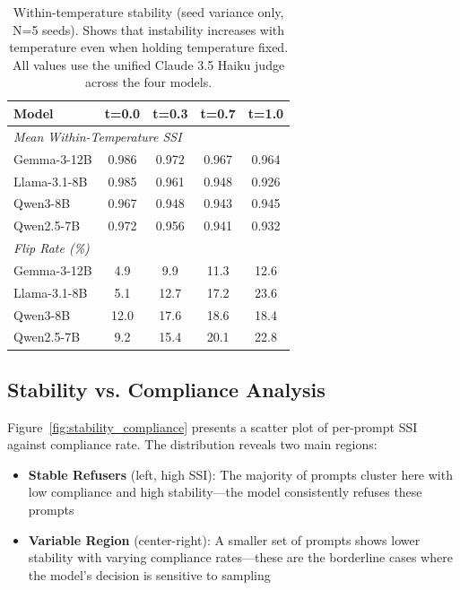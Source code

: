 \documentclass[11pt]{article}
\begin{document}
\begin{table}[h]
\centering
\caption{Within-temperature stability (seed variance only, N=5 seeds). Shows that instability increases with temperature even when holding temperature fixed. All values use the unified Claude 3.5 Haiku judge across the four models.}
\label{tab:within_temp}
\begin{tabular}{lcccc}
\toprule
\textbf{Model} & \textbf{t=0.0} & \textbf{t=0.3} & \textbf{t=0.7} & \textbf{t=1.0} \\
\midrule
\multicolumn{5}{l}{\textit{Mean Within-Temperature SSI}} \\
Gemma-3-12B & 0.986 & 0.972 & 0.967 & 0.964 \\
Llama-3.1-8B & 0.985 & 0.961 & 0.948 & 0.926 \\
Qwen3-8B & 0.967 & 0.948 & 0.943 & 0.945 \\
Qwen2.5-7B & 0.972 & 0.956 & 0.941 & 0.932 \\
\midrule
\multicolumn{5}{l}{\textit{Flip Rate (\%)}} \\
Gemma-3-12B & 4.9 & 9.9 & 11.3 & 12.6 \\
Llama-3.1-8B & 5.1 & 12.7 & 17.2 & 23.6 \\
Qwen3-8B & 12.0 & 17.6 & 18.6 & 18.4 \\
Qwen2.5-7B & 9.2 & 15.4 & 20.1 & 22.8 \\
\bottomrule
\end{tabular}
\end{table}

\subsection{Stability vs. Compliance Analysis}

Figure~\ref{fig:stability_compliance} presents a scatter plot of per-prompt SSI against compliance rate. The distribution reveals two main regions:

\begin{itemize}
    \item \textbf{Stable Refusers} (left, high SSI): The majority of prompts cluster here with low compliance and high stability---the model consistently refuses these prompts
    \item \textbf{Variable Region} (center-right): A smaller set of prompts shows lower stability with varying compliance rates---these are the borderline cases where the model's decision is sensitive to sampling
\end{itemize}
\end{document}
